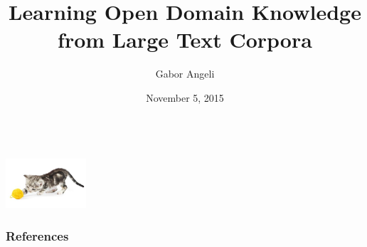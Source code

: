 \documentclass[hyperref]{beamer}
\title[Learning Knowledge From Text]{Learning Open Domain Knowledge from Large Text Corpora}
\subtitle{}
\author{Gabor Angeli}
\date{November 5, 2015}
\institute[Stanford]{Stanford University}
\begin{document}
\begin{frame}[noframenumbering]
  \titlepage
\end{frame}







\begin{frame}{}
\begin{center}
   \\
  \vspace{1cm}
  \includegraphics[width=3cm]{../img/yarn-cat.jpg} \\
\end{center}
\end{frame}



\begin{frame}[allowframebreaks]
  \frametitle{References}
  
  
\end{frame}
\end{document}
